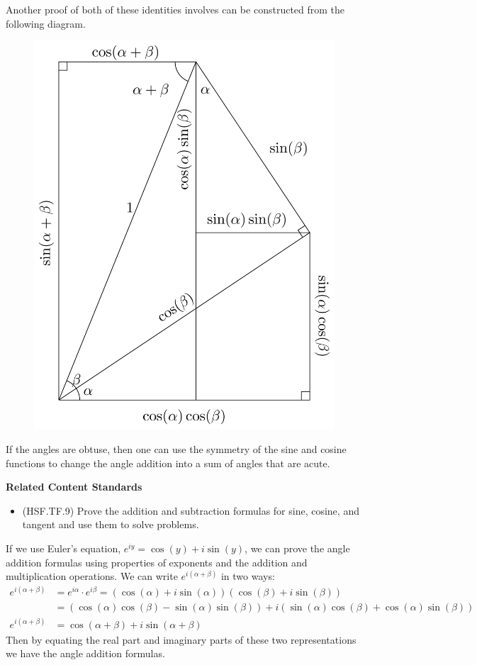 \documentclass[
]{book}
\providecommand{\tightlist}{%
  \setlength{\itemsep}{0pt}\setlength{\parskip}{0pt}}
\newenvironment{standards}{}{}
\theoremstyle{definition}
\theoremstyle{definition}
\theoremstyle{definition}
\theoremstyle{definition}
\theoremstyle{remark}
\begin{document}
Another proof of both of these identities involves can be constructed from the following diagram.

\begin{figure}

{\centering \includegraphics[width=0.6\linewidth]{tikz/angle-addition-sine3} 

}

\end{figure}

If the angles are obtuse, then one can use the symmetry of the sine and cosine functions to change the angle addition into a sum of angles that are acute.

\begin{standards}

\begin{center}
\textbf{Related Content Standards}

\end{center}

\begin{itemize}
\tightlist
\item
  (HSF.TF.9) Prove the addition and subtraction formulas for sine, cosine, and tangent and use them to solve problems.
\end{itemize}

\end{standards}

If we use Euler's equation, \(e^{iy} = \cos(y) + i \sin(y)\), we can prove the angle addition formulas using properties of exponents and the addition and multiplication operations. We can write \(e^{i(\alpha+\beta)}\) in two ways:
\begin{align*}
e^{i(\alpha+\beta)} &= e^{i\alpha} \cdot e^{i\beta} = (\cos(\alpha) + i \sin(\alpha) ) (\cos(\beta) + i \sin(\beta))\\
&= \left( \cos(\alpha)\cos(\beta)-\sin(\alpha)\sin(\beta)\right) + i \left( \sin(\alpha)\cos(\beta) + \cos(\alpha)\sin(\beta)\right) \\
e^{i(\alpha+\beta)} &= \cos(\alpha+\beta) + i \sin(\alpha+\beta)
\end{align*}
Then by equating the real part and imaginary parts of these two representations we have the angle addition formulas.
\end{document}
